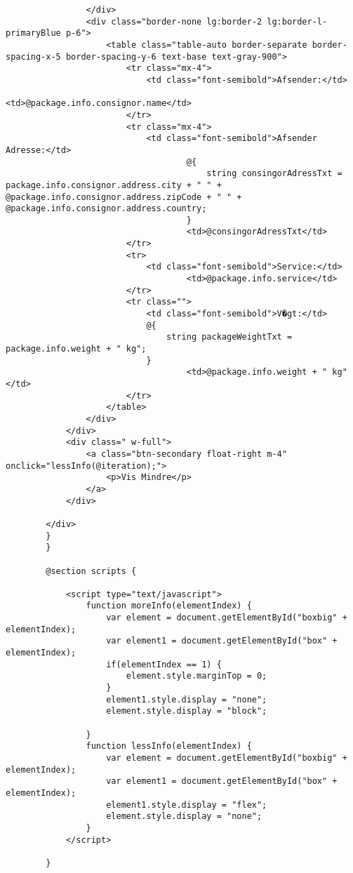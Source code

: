 \begin{verbatim}
                </div>
                <div class="border-none lg:border-2 lg:border-l-primaryBlue p-6">
                    <table class="table-auto border-separate border-spacing-x-5 border-spacing-y-6 text-base text-gray-900">
                        <tr class="mx-4">
                            <td class="font-semibold">Afsender:</td>
                                    <td>@package.info.consignor.name</td>
                        </tr>
                        <tr class="mx-4">
                            <td class="font-semibold">Afsender Adresse:</td>
                                    @{
                                        string consingorAdressTxt = package.info.consignor.address.city + " " + @package.info.consignor.address.zipCode + " " + @package.info.consignor.address.country;
                                    }
                                    <td>@consingorAdressTxt</td>
                        </tr>
                        <tr>
                            <td class="font-semibold">Service:</td>
                                    <td>@package.info.service</td>
                        </tr>
                        <tr class="">
                            <td class="font-semibold">V�gt:</td>
                            @{
                                string packageWeightTxt = package.info.weight + " kg";
                            }
                                    <td>@package.info.weight + " kg"</td>
                        </tr>
                    </table>
                </div>
            </div>
            <div class=" w-full">
                <a class="btn-secondary float-right m-4" onclick="lessInfo(@iteration);">
                    <p>Vis Mindre</p>
                </a>
            </div>

        </div>
        }
        }

        @section scripts {

            <script type="text/javascript">
                function moreInfo(elementIndex) {
                    var element = document.getElementById("boxbig" + elementIndex);
                    var element1 = document.getElementById("box" + elementIndex);
                    if(elementIndex == 1) {
                        element.style.marginTop = 0;
                    }
                    element1.style.display = "none";
                    element.style.display = "block";

                }
                function lessInfo(elementIndex) {
                    var element = document.getElementById("boxbig" + elementIndex);
                    var element1 = document.getElementById("box" + elementIndex);
                    element1.style.display = "flex";
                    element.style.display = "none";
                }
            </script>

        }
        
\end{verbatim}


